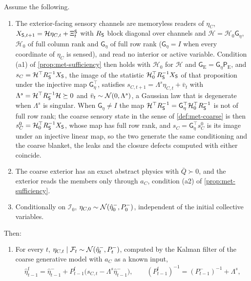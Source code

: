 \begin{proposition}\label{prop:met-consensus-filter}
Assume the following.
\begin{enumerate}
\item[(S)] The exterior-facing sensory channels are memoryless readers of $\eta_C$, $X_{\mathsf{S},t+1}=\mathcal H\eta_{C,t}+\Xi^{\mathsf{S}}_t$ with $R_{\mathsf{S}}$ block diagonal over channels and $\mathcal H=\mathcal H_0\mathsf G_\eta$, $\mathcal H_0$ of full column rank and $\mathsf G_\eta$ of full row rank ($\mathsf G_\eta=I$ when every coordinate of $\eta_C$ is sensed), and read no interior or active variable. Condition (a1) of \cref{prop:met-sufficiency} then holds with $\mathcal H_0$ for $\mathcal H$ and $\mathsf G_{\mathrm E}=\mathsf G_\eta\mathsf P_{\mathrm E}$, and $s_C=\mathcal H^\top R_{\mathsf{S}}^{-1}X_{\mathsf{S}}$, the image of the statistic $\mathcal H_0^\top R_{\mathsf{S}}^{-1}X_{\mathsf{S}}$ of that proposition under the injective map $\mathsf G_\eta^\top$, satisfies $s_{C,t+1}=\Lambda^s\eta_{C,t}+\bar v_t$ with $\Lambda^s=\mathcal H^\top R_{\mathsf{S}}^{-1}\mathcal H\succeq0$ and $\bar v_t\sim\mathcal{N}(0,\Lambda^s)$, a Gaussian law that is degenerate when $\Lambda^s$ is singular. When $\mathsf G_\eta\ne I$ the map $\mathcal H^\top R_{\mathsf{S}}^{-1}=\mathsf G_\eta^\top\mathcal H_0^\top R_{\mathsf{S}}^{-1}$ is not of full row rank; the coarse sensory state in the sense of \cref{def:met-coarse} is then $s^0_C=\mathcal H_0^\top R_{\mathsf{S}}^{-1}X_{\mathsf{S}}$, whose map has full row rank, and $s_C=\mathsf G_\eta^\top s^0_C$ is its image under an injective linear map, so the two generate the same conditioning and the coarse blanket, the leaks and the closure defects computed with either coincide.
\item[(X)] The coarse exterior has an exact abstract physics with $\bar Q\succ0$, and the exterior reads the members only through $a_C$, condition (a2) of \cref{prop:met-sufficiency}.
\item[(Ind)] Conditionally on $\mathcal I_0$, $\eta_{C,0}\sim\mathcal{N}(\hat\eta^-_0,P^-_0)$, independent of the initial collective variables.
\end{enumerate}
Then:
\begin{enumerate}
\item[(a)] For every $t$, $\eta_{C,t}\mid\mathcal F_t\sim\mathcal{N}(\hat\eta^-_t,P^-_t)$, computed by the Kalman filter of the coarse generative model with $a_C$ as a known input,
\begin{equation}\label{eq:met-filter}
\begin{gathered}
\hat\eta^{\mathrm f}_{t-1}=\hat\eta^-_{t-1}+P^{\mathrm f}_{t-1}\bigl(s_{C,t}-\Lambda^s\hat\eta^-_{t-1}\bigr),\qquad(P^{\mathrm f}_{t-1})^{-1}=(P^-_{t-1})^{-1}+\Lambda^s,\\

\end{gathered}
\end{equation}
\end{enumerate}
\end{proposition}
